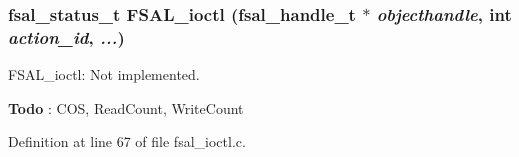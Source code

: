 \subsubsection{\setlength{\rightskip}{0pt plus 5cm}fsal\_\-status\_\-t FSAL\_\-ioctl (fsal\_\-handle\_\-t $\ast$ {\em objecthandle}, int {\em action\_\-id},  {\em ...})}\label{fsal__ioctl_8c_a5}


FSAL\_\-ioctl: Not implemented.

\begin{Desc}
\item[{\bf Todo}]: COS, Read\-Count, Write\-Count\end{Desc}


Definition at line 67 of file fsal\_\-ioctl.c.